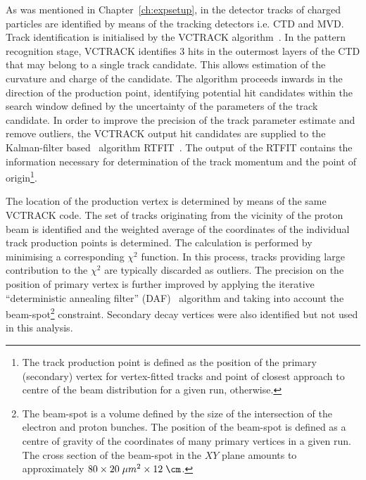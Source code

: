 As was mentioned in Chapter~\ref{ch:expsetup}, in the \zeus detector tracks of charged particles are identified by means of the tracking detectors i.e. CTD and MVD. Track identification is initialised by the VCTRACK algorithm~\cite{upub:hartner:zn9858,upub:hartner:zn9764}. In the pattern recognition stage, VCTRACK identifies 3 hits in the outermost layers of the CTD that may belong to a single track candidate. This allows estimation of the curvature and charge of the candidate. The algorithm proceeds inwards in the direction of the production point, identifying potential hit candidates within the search window defined by the uncertainty of the parameters of the track candidate. In order to improve the precision of the track parameter estimate and remove outliers, the VCTRACK output hit candidates are supplied to the Kalman-filter based~\cite{Klaman:1960} algorithm RTFIT~\cite{upub:spiridonov:rtfit}. The output of the RTFIT contains the information necessary for determination of the track momentum and the point of origin\footnote{The track production point is defined as the position of the primary (secondary) vertex for vertex-fitted tracks and point of closest approach to centre of the beam distribution for a given run, otherwise.}.

The location of the production vertex is determined by means of the same VCTRACK code. The set of tracks originating from the vicinity of the proton beam is identified and the weighted average of the coordinates of the individual track production points is determined. The calculation is performed by minimising a corresponding $\chi^2$ function. In this process, tracks providing large contribution to the $\chi^2$ are typically discarded as outliers. The precision on the position of primary vertex is further improved by applying the iterative ``deterministic annealing filter'' (DAF)~\cite{Fruewirth:2010} algorithm and taking into account the beam-spot\footnote{The beam-spot is a volume defined by the size of the intersection of the electron and proton bunches. The position of the beam-spot is defined as a centre of gravity of the coordinates of many primary vertices in a given run. The cross section of the beam-spot in the $XY$ plane amounts to approximately $80 \times 20\; \mu m^{2} \times 12\; \cm$.} constraint. Secondary decay vertices were also identified but not used in this analysis.